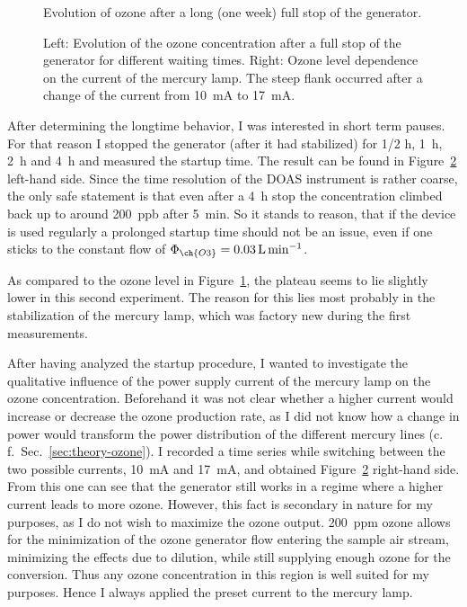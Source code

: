 \begin{figure}[htbp]
  \centering
  
  \caption{Evolution of ozone after a long (one week) full stop of the
    generator.}
  \label{fig:long-stop}
\end{figure}
\begin{figure}[htbp]
  \centering
  
  \hfill
  
  \caption{Left: Evolution of the ozone concentration after a full stop of the
    generator for different waiting times. Right: Ozone level
    dependence on the current of the mercury lamp. The steep
    flank occurred after a change of the current from
    \SI{10}{\milli\ampere} to \SI{17}{\milli\ampere}.}
  \label{fig:multiple-stop}
\end{figure}

After determining the longtime behavior, I was interested in
short term pauses. For that reason I stopped the generator (after it
had stabilized) for {\nfrac{} 1/2} \si{\hour}, \SI{1}{\hour},
\SI{2}{\hour} and \SI{4}{\hour} and measured the startup time. The
result can be found in Figure~\ref{fig:multiple-stop}
left-hand side. Since the time resolution of the DOAS instrument is
rather coarse, the only safe statement is that even after a
\SI{4}{\hour} stop the concentration climbed back up to around
\SI{200}{ppb} after \SI{5}{\minute}. So it stands to reason, that if
the device is used regularly a prolonged startup time should not be an
issue, even if one sticks to the constant flow of $\Phi_{\ch{O3}} =
\SI{0.03}{\liter\per\minute}$.

As compared to the ozone level in Figure~\ref{fig:long-stop}, the
plateau seems to lie slightly lower in this second experiment. The
reason for this lies most probably in the stabilization of the mercury
lamp, which was factory new during the first measurements.

After having analyzed the startup procedure, I wanted to investigate
the qualitative influence of the power supply current of the mercury
lamp on the ozone concentration. Beforehand it was not clear whether a
higher current would increase or decrease the ozone production rate,
as I did not know how a change in power would transform the power
distribution of the different mercury lines (c.\,f.\
Sec.~\ref{sec:theory-ozone}). I recorded a time series while switching
between the two possible currents, \SI{10}{\milli\ampere} and
\SI{17}{\milli\ampere}, and obtained Figure~\ref{fig:multiple-stop}
right-hand side. From this one can see that the generator still works
in a regime where a higher current leads to more ozone. However, this
fact is secondary in nature for my purposes, as I do not wish to
maximize the ozone output. \SI{200}{ppm} ozone allows for the
minimization of the ozone generator flow entering the sample air
stream, minimizing the effects due to dilution, while still supplying
enough ozone for the conversion. Thus any ozone concentration in this
region is well suited for my purposes. Hence I always applied the
preset current to the mercury lamp.


